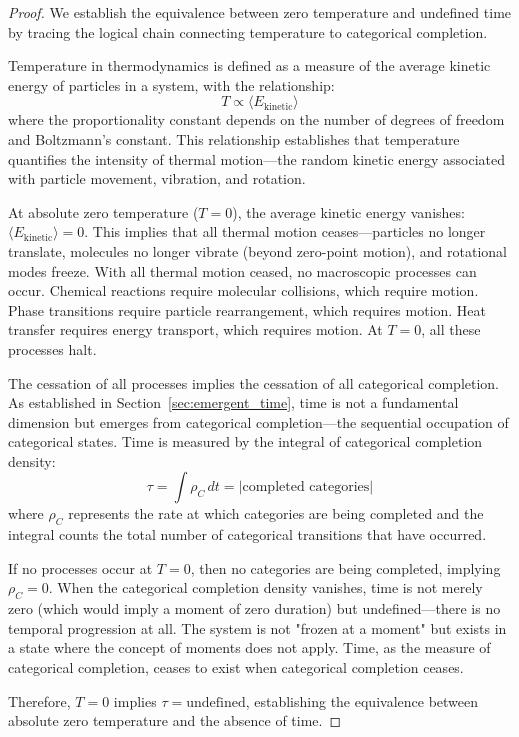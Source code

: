 \documentclass[12pt,a4paper]{article}
\theoremstyle{definition}
\theoremstyle{remark}
\begin{document}
\begin{proof}
We establish the equivalence between zero temperature and undefined time by tracing the logical chain connecting temperature to categorical completion.

Temperature in thermodynamics is defined as a measure of the average kinetic energy of particles in a system, with the relationship:
\begin{equation}
T \propto \langle E_{\text{kinetic}} \rangle
\end{equation}
where the proportionality constant depends on the number of degrees of freedom and Boltzmann's constant. This relationship establishes that temperature quantifies the intensity of thermal motion—the random kinetic energy associated with particle movement, vibration, and rotation.

At absolute zero temperature ($T = 0$), the average kinetic energy vanishes: $\langle E_{\text{kinetic}} \rangle = 0$. This implies that all thermal motion ceases—particles no longer translate, molecules no longer vibrate (beyond zero-point motion), and rotational modes freeze. With all thermal motion ceased, no macroscopic processes can occur. Chemical reactions require molecular collisions, which require motion. Phase transitions require particle rearrangement, which requires motion. Heat transfer requires energy transport, which requires motion. At $T = 0$, all these processes halt.

The cessation of all processes implies the cessation of all categorical completion. As established in Section~\ref{sec:emergent_time}, time is not a fundamental dimension but emerges from categorical completion—the sequential occupation of categorical states. Time is measured by the integral of categorical completion density:
\begin{equation}
\tau = \int \rho_C \, dt = |\text{completed categories}|
\end{equation}
where $\rho_C$ represents the rate at which categories are being completed and the integral counts the total number of categorical transitions that have occurred.

If no processes occur at $T = 0$, then no categories are being completed, implying $\rho_C = 0$. When the categorical completion density vanishes, time is not merely zero (which would imply a moment of zero duration) but undefined—there is no temporal progression at all. The system is not "frozen at a moment" but exists in a state where the concept of moments does not apply. Time, as the measure of categorical completion, ceases to exist when categorical completion ceases.

Therefore, $T = 0$ implies $\tau = \text{undefined}$, establishing the equivalence between absolute zero temperature and the absence of time.
\end{proof}
\end{document}
